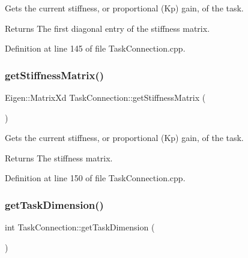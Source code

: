 Gets the current stiffness, or proportional (Kp) gain, of the task.

\begin{DoxyReturn}{Returns}
The first diagonal entry of the stiffness matrix. 
\end{DoxyReturn}


Definition at line 145 of file Task\+Connection.\+cpp.

\hypertarget{classocra__recipes_1_1TaskConnection_abbcaa5c1769afc4e4074486fe4fb319a}{}\label{classocra__recipes_1_1TaskConnection_abbcaa5c1769afc4e4074486fe4fb319a} 
\subsubsection{\texorpdfstring{get\+Stiffness\+Matrix()}{getStiffnessMatrix()}}
{\footnotesize\ttfamily Eigen\+::\+Matrix\+Xd Task\+Connection\+::get\+Stiffness\+Matrix (\begin{DoxyParamCaption}{ }\end{DoxyParamCaption})}

Gets the current stiffness, or proportional (Kp) gain, of the task.

\begin{DoxyReturn}{Returns}
The stiffness matrix. 
\end{DoxyReturn}


Definition at line 150 of file Task\+Connection.\+cpp.

\hypertarget{classocra__recipes_1_1TaskConnection_a14a0075a94a7df0f912b7dbd8f56d8e2}{}\label{classocra__recipes_1_1TaskConnection_a14a0075a94a7df0f912b7dbd8f56d8e2} 
\subsubsection{\texorpdfstring{get\+Task\+Dimension()}{getTaskDimension()}}
{\footnotesize\ttfamily int Task\+Connection\+::get\+Task\+Dimension (\begin{DoxyParamCaption}{ }\end{DoxyParamCaption})}



